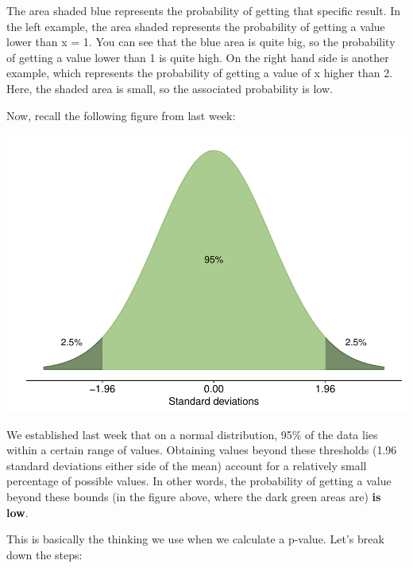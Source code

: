 \documentclass[
]{book}
\begin{document}


The area shaded blue represents the probability of getting that specific result. In the left example, the area shaded represents the probability of getting a value lower than x = 1. You can see that the blue area is quite big, so the probability of getting a value lower than 1 is quite high. On the right hand side is another example, which represents the probability of getting a value of x higher than 2. Here, the shaded area is small, so the associated probability is low.

Now, recall the following figure from last week:

\begin{center}\includegraphics{_main_files/figure-latex/unnamed-chunk-93-1} \end{center}

We established last week that on a normal distribution, 95\% of the data lies within a certain range of values. Obtaining values beyond these thresholds (1.96 standard deviations either side of the mean) account for a relatively small percentage of possible values. In other words, the probability of getting a value beyond these bounds (in the figure above, where the dark green areas are) \textbf{is low}.

This is basically the thinking we use when we calculate a p-value. Let's break down the steps:
\end{document}

